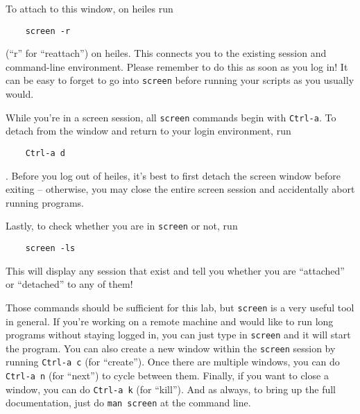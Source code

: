 \documentclass[psfig,preprint]{aastex}
\begin{document}
To attach to this window, on heiles run 
\begin{verbatim}
    screen -r
\end{verbatim} 
(``r'' for ``reattach'') on heiles. This connects you to the existing session and command-line environment. Please remember to do this as soon as you log in! It can be easy to forget to go into \texttt{screen} before running your scripts as you usually would.

While you're in a screen session, all \texttt{screen} commands begin with \texttt{Ctrl-a}. To detach from the window and return to your login environment, run
\begin{verbatim}
    Ctrl-a d
\end{verbatim}. 
Before you log out of heiles, it's best to first detach the screen window before exiting -- otherwise, you may close the entire screen session and accidentally abort running programs.

Lastly, to check whether you are in \texttt{screen} or not, run
\begin{verbatim}
    screen -ls
\end{verbatim}
This will display any session that exist and tell you whether you are ``attached'' or ``detached'' to any of them!

Those commands should be sufficient for this lab, but \texttt{screen} is a very useful tool in general. If you're working on a remote machine and would like to run long programs without staying logged in, you can just type in  \texttt{screen} and it will start the program. You can also create a new window within the \texttt{screen} session by running \texttt{Ctrl-a c} (for ``create''). Once there are multiple windows, you can do \texttt{Ctrl-a n} (for ``next'') to cycle between them. Finally, if you want to close a window, you can do \texttt{Ctrl-a k} (for ``kill''). And as always, to bring up the full documentation, just do \texttt{man screen} at the command line.
\end{document}
